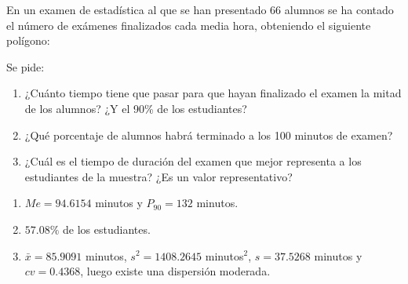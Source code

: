 {En un examen de estadística al que se han presentado 66 alumnos se ha contado el número de exámenes finalizados cada media hora, obteniendo el siguiente polígono:
\begin{center}
\resizebox{0.7\textwidth}{!}{}
\end{center}
Se pide:
\begin{enumerate}
\item ¿Cuánto tiempo tiene que pasar para que hayan finalizado el examen la mitad de los alumnos? ¿Y el 90\% de los estudiantes?
\item ¿Qué porcentaje de alumnos habrá terminado a los 100 minutos de examen?
\item ¿Cuál es el tiempo de duración del examen que mejor representa a los estudiantes de la muestra? ¿Es un valor representativo?  
\end{enumerate}
}
{\begin{enumerate}
\item $Me = 94.6154$ minutos y $P_{90}=132$ minutos.
\item $57.08\%$ de los estudiantes.
\item $\bar x= 85.9091$ minutos, $s^2 =1408.2645$ minutos$^2$, $s= 37.5268$ minutos y $cv= 0.4368$, luego existe una dispersión moderada. 
\end{enumerate}
}
